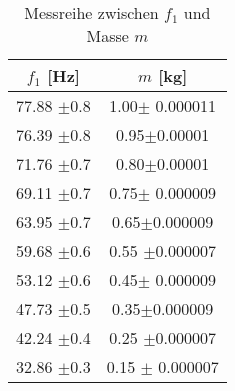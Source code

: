 \begin{table}[H]
    \centering
		\caption{Messreihe zwischen $ f_{1} $ und Masse $ m $}
		\begin{tabular}{|c|c|}
			\hline
			$ f_{1} $ [Hz]& $ m $ [kg] \\
			\hline
			77.88 $ \pm $0.8& 1.00$ \pm $ 0.000011\\
			\hline
			76.39 $ \pm $0.8& 0.95$ \pm $0.00001 \\
			\hline
			71.76 $ \pm $0.7&  0.80$ \pm $0.00001\\
			\hline
			69.11 $ \pm $0.7& 0.75$ \pm $ 0.000009\\
			\hline
			63.95 $ \pm $0.7&  0.65$ \pm $0.000009\\
			\hline
			59.68 $ \pm $0.6& 0.55 $ \pm $0.000007\\
			\hline
			53.12 $ \pm $0.6& 0.45$ \pm $ 0.000009\\
			\hline
			47.73 $ \pm $0.5& 0.35$ \pm $0.000009\\
			\hline
			42.24 $ \pm $0.4& 0.25 $ \pm $0.000007\\
			\hline
			32.86 $ \pm $0.3& 0.15 $ \pm $ 0.000007\\
			\hline
		\end{tabular}
		\label{tab: m}
\end{table}